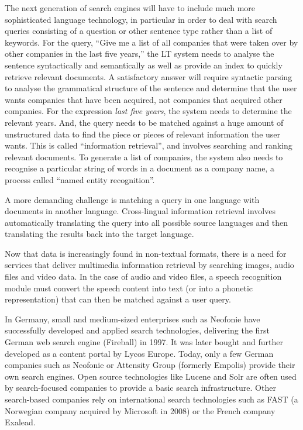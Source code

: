 \documentclass[]{../metanetpaper}
\begin{document}
\begin{Parallel}[c]{80mm}{80mm}
{    The next generation of search engines will have to include much more sophisticated language technology, in particular in order to deal with search queries consisting of a question or other sentence type rather than a list of keywords. For the query, “Give me a list of all companies that were taken over by other companies in the last five years,” the LT system needs to analyse the sentence syntactically and semantically as well as provide an index to quickly retrieve relevant documents. A satisfactory answer will require syntactic parsing to analyse the grammatical structure of the sentence and determine that the user wants companies that have been acquired, not companies that acquired other companies. For the expression \textit{last five years}, the system needs to determine the relevant years. And, the query needs to be matched against a huge amount of unstructured data to find the piece or pieces of relevant information the user wants. This is called “information retrieval”, and involves searching and ranking relevant documents. To generate a list of companies, the system also needs to recognise a particular string of words in a document as a company name, a process called “named entity recognition”.

    A more demanding challenge is matching a query in one language with documents in another language. Cross-lingual information retrieval involves automatically translating the query into all possible source languages and then translating the results back into the target language. 

    Now that data is increasingly found in non-textual formats, there is a need for services that deliver multimedia information retrieval by searching images, audio files and video data. In the case of audio and video files, a speech recognition module must convert the speech content into text (or into a phonetic representation) that can then be matched against a user query.

    In Germany, small and medium-sized enterprises such as Neofonie have successfully developed and applied search technologies, delivering the first German web search engine (Fireball) in 1997. It was later bought and further developed as a content portal by Lycos Europe. Today, only a few German companies such as Neofonie or Attensity Group (formerly Empolis) provide their own search engines. Open source technologies like Lucene and Solr are often used by search-focused companies to provide a basic search infrastructure. Other search-based companies rely on international search technologies such as FAST (a Norwegian company acquired by Microsoft in 2008) or the French company Exalead.

}
\end{Parallel}
\end{document}
